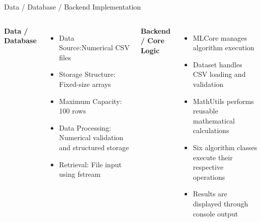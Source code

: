 \documentclass[aspectratio=169,11pt]{beamer}
\begin{document}
\begin{frame}{Data / Database / Backend Implementation}

\begin{columns}[T,totalwidth=\textwidth]


\textbf{\color{GEUBlue}Data / Database}

\begin{itemize}\itemsep3pt
    \item {Data Source:Numerical CSV files}
    \item {Storage Structure: Fixed-size arrays}
    \item {Maximum Capacity: 100 rows}
    \item {Data Processing: Numerical validation and structured storage}
    \item {Retrieval: File input using fstream}
\end{itemize}


\textbf{\color{GEUBlue}Backend / Core Logic}

\begin{itemize}\itemsep3pt
    \item {MLCore manages algorithm execution}
    \item {Dataset handles CSV loading and validation}
    \item {MathUtils performs reusable mathematical calculations}
    \item {Six algorithm classes execute their respective operations}
    \item {Results are displayed through console output}
\end{itemize}

\end{columns}

\vfill

\end{frame}
\end{document}
